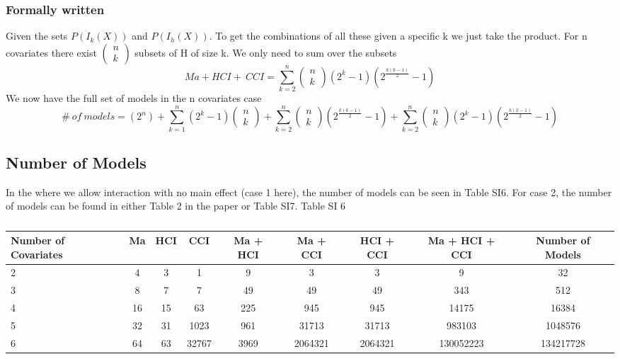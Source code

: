 \subsubsection{Formally written}

Given the sets $P\left(I_k\left(X\right)\right)$ and $P\left(I_h\left(X\right)\right)$. To get the combinations of all these given a specific k we just take the product. For n covariates there exist $\left( \begin{array}{c}
n \\ 
k \end{array}
\right)$ subsets of H of size k. We only need to sum over the subsets
\[Ma+HCI+\ CCI=\sum^n_{k=2}{\left( \begin{array}{c}
n \\ 
k \end{array}
\right)\left(2^k-1\right)\left(2^{\frac{k\left(k-1\right)}{2}}-1\right)}\] 
We now have the full set of models in the n covariates case
\[\#\ of\ models=\left(2^n\right)+\sum^n_{k=1}{\left(2^k-1\right)\left( \begin{array}{c}
n \\ 
k \end{array}
\right)}+\sum^n_{k=2}{\left( \begin{array}{c}
n \\ 
k \end{array}
\right)\left(2^{\frac{k\left(k-1\right)}{2}}-1\right)}+\sum^n_{k=2}{\left( \begin{array}{c}
n \\ 
k \end{array}
\right)\left(2^k-1\right)\left(2^{\frac{k\left(k-1\right)}{2}}-1\right)}\] 
\subsection{Number of Models}

\noindent In the where we allow interaction with no main effect (case 1 here), the number of models can be seen in Table SI6. For case 2, the number of models can be found in either Table 2 in the paper or Table SI7. Table SI 6

\begin{table}
\caption{}
\begin{tabular}{lcccccccc}  
\toprule
Number of Covariates & Ma & HCI & CCI & Ma + HCI & Ma + CCI & HCI + CCI & Ma + HCI + CCI & Number of Models \\ 
\midrule
2 & 4 & 3 & 1 & 9 & 3 & 3 & 9 & 32 \\  
3 & 8 & 7 & 7 & 49 & 49 & 49 & 343 & 512 \\  
4 & 16 & 15 & 63 & 225 & 945 & 945 & 14175 & 16384 \\  
5 & 32 & 31 & 1023 & 961 & 31713 & 31713 & 983103 & 1048576 \\  
6 & 64 & 63 & 32767 & 3969 & 2064321 & 2064321 & 130052223 & 134217728 \\  
\bottomrule
\end{tabular}
\end{table}




